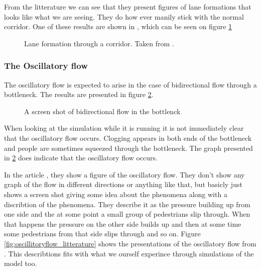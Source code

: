 From the litterature we can see that they present figures of lane formations
 that looks like what we are seeing. They do how ever manily stick with the normal corridor. One of these results are shown in \cite{lanes}, which can be seen on figure \ref{fig:laneformation_litterature}
\begin{figure}[h]
\centering
{}
\caption{Lane formation through a corridor. Taken from \cite{lanes}.}
\label{fig:laneformation_litterature}
\end{figure}
 


\subsubsection{The Oscillatory flow}
The oscillatory flow is expected to arise in the case of bidirectional
flow through a bottleneck. The results are presented in figure
\ref{fig:oscillitoryflow}.\\

\begin{figure}[h]
\centering
{\resizebox{7cm}{!}{}}
\caption{A screen shot of bidirectional flow in the bottlenck}
\label{fig:oscillitoryflow}
\end{figure}

When looking at the simulation while it is running it is not
immediately clear that the oscillatory flow occurs. Clogging
appears in both ends of the bottleneck and people are sometimes
squeezed through the bottleneck. The graph presented in
\ref{fig:oscillitoryflow} does indicate that the oscillatory
flow occurs.

In the article \cite{oscil}, they show a figure of the oscillatory flow. They 
don't show any graph of the flow in different directions or anything like 
that, but basicly just shows a screen shot giving some idea about the 
phenomena along with a discribtion of the phenomena. They describe it as the 
pressure building up from one side and the at some point a small group of 
pedestrians slip through. When that happens the pressure on the other side 
builds up and then at some time some pedestrians from that side slips through 
and so on. Figure \ref{fig:oscillitoryflow_litterature} shows the 
presentations of the oscillatory flow from \cite{oscil}. This describtions 
fits with what we ourself experince through simulations of the model too.

